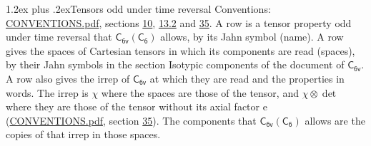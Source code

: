 \documentclass[10pt,a4paper]{article}
\makeatletter
\renewcommand\section{\@startsection{section}{1}{\z@}{-3ex plus -1ex minus -.2ex}%
  {1.2ex plus .2ex}{\normalfont\large\sffamily\bfseries\color{parttitle}}}
\numberwithin{equation}{section}
\newcommand{\grp}[1]{\mathsf{#1}}
\newcommand{\irrprod}{\otimes}
\makeatother
\begin{document}
\section{Tensors odd under time reversal}\label{s:time_odd}
Conventions: \href{../../CONVENTIONS.pdf}{CONVENTIONS.pdf}, sections \href{../../../rotation/CONVENTIONS.pdf\#conv.10}{10}, \href{../../../rotation/CONVENTIONS.pdf\#conv.13.2}{13.2} and \href{../../CONVENTIONS.pdf\#conv.35}{35}.
\leavevmode\label{n:head.name.property}A row is a tensor property odd under time reversal that $\grp{C_{6v}}(\grp{C_{6}})$ allows, by its Jahn symbol (name). \label{n:head.spaces}A row gives the spaces of Cartesian tensors in which its components are read (spaces), by their Jahn symbols in the section Isotypic components of the document of \href{../../../rotation/data/pdf/C6v.pdf}{$\grp{C_{6v}}$}. \label{n:head.properties}A row also gives the irrep of $\grp{C_{6v}}$ at which they are read and the properties in words. The irrep is $\chi$ where the spaces are those of the tensor, and $\chi \irrprod \det$ where they are those of the tensor without its axial factor e (\href{../../CONVENTIONS.pdf}{CONVENTIONS.pdf}, section \href{../../CONVENTIONS.pdf\#conv.35}{35}). The components that $\grp{C_{6v}}(\grp{C_{6}})$ allows are the copies of that irrep in those spaces.
\end{document}
